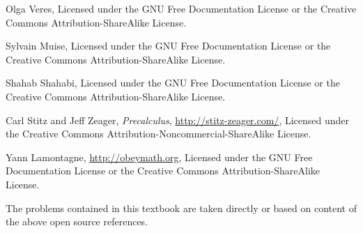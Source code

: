\begin{thebibliography}{9}
Olga Veres,
Licensed under the GNU Free Documentation License or the
Creative Commons Attribution-ShareAlike License.

Sylvain Muise,
Licensed under the GNU Free Documentation License or the
Creative Commons Attribution-ShareAlike License.

Shahab Shahabi,
Licensed under the GNU Free Documentation License or the
Creative Commons Attribution-ShareAlike License.

Carl Stitz and Jeff Zeager,
\emph{Precalculus},
\url{http://stitz-zeager.com/},
Licensed under the
Creative Commons Attribution-Noncommercial-ShareAlike License.

Yann Lamontagne,
\url{http://obeymath.org},
Licensed under the GNU Free Documentation License or the 
Creative Commons Attribution-ShareAlike License.

\end{thebibliography}
The problems contained in this textbook are taken directly or based on content of the above open source references.



